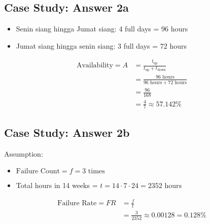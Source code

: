 \documentclass[
	11pt, %
	indonesian
]{assignment}
\begin{document}
\subsection*{Case Study: Answer 2a}

\begin{itemize}
	\item Senin siang hingga Jumat siang: 4 full days = 96 hours
	\item Jumat siang hingga senin siang: 3 full days = 72 hours
\end{itemize}

\[
	\begin{aligned}
		\text{Availability} = A & = \frac{t_{\text{up}}}{t_{\text{up}} + t_{\text{down}}}        \\
		                        & = \frac{96 \text{ hours}}{96 \text{ hours} + 72 \text{ hours}} \\
		                        & = \frac{96}{168}                                               \\
		                        & = \frac{4}{7} \approx 57.142 \%
	\end{aligned}
\]

\subsection*{Case Study: Answer 2b}

Assumption:

\begin{itemize}
	\item \(\text{Failure Count} = f = 3 \text{ times}\)
	\item Total hours in 14 weeks = \( t = 14 \cdot 7 \cdot 24 = 2352 \text{ hours}\)
\end{itemize}

\[
	\begin{aligned}
		\text{Failure Rate} = FR & = \frac{f}{t}                               \\
		                         & = \frac{3}{2352} \approx 0.00128 = 0.128 \%
	\end{aligned}
\]
\end{document}
